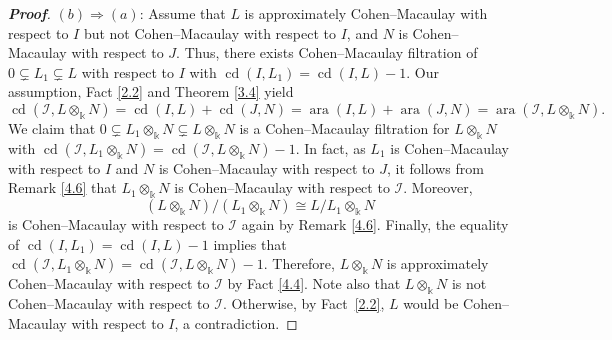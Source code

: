 \documentclass[10pt,a4paper]{amsart}
\numberwithin{equation}{theorem}
\theoremstyle{definition}
\theoremstyle{fact}
\theoremstyle{conjecture}
\newcommand{\ara}{\operatorname{ara}}
\newcommand{\cd}{\operatorname{cd}}
\newenvironment{prf}[1][Proof]{\begin{proof}[\bf #1]}{\end{proof}}
\begin{document}
\begin{prf}
\((b) \Rightarrow (a)\): Assume that $L$ is approximately Cohen--Macaulay with respect to $I$ but not Cohen--Macaulay with respect to $I$, and $N$ is Cohen--Macaulay with respect to $J$.
  Thus, there exists Cohen--Macaulay filtration of $0  \subsetneq L_1 \subsetneq L$ with respect to $I$ with
$\cd(I, L_1)=\cd(I,  L)-1$.
Our assumption, Fact \ref{2.2} and Theorem \ref{3.4} yield
\[
\cd(\mathcal{I}, L\otimes_\Bbbk N)= \cd(I, L)+\cd(J, N)= \ara(I, L)+\ara(J, N)=\ara(\mathcal{I}, L\otimes_\Bbbk N).
\]
We claim that $0\subsetneq L_1\otimes_\Bbbk N \subsetneq L\otimes_\Bbbk N$ is a Cohen--Macaulay filtration for $L\otimes_\Bbbk N$ with
$\cd(\mathcal{I}, L_1\otimes_\Bbbk N) =\cd(\mathcal{I}, L\otimes_\Bbbk N)-1$.
In fact, as $L_1$ is Cohen--Macaulay with respect to $I$ and $N$ is Cohen--Macaulay with respect to $J$, it follows from Remark \ref{4.6} that $L_1\otimes_\Bbbk N$ is Cohen--Macaulay with respect to $\mathcal{I}$. Moreover,
\[
(L\otimes_\Bbbk N)/(L_1\otimes_\Bbbk N)\cong L/L_1\otimes_\Bbbk N
\]
is Cohen--Macaulay with respect to $\mathcal{I}$ again by Remark \ref{4.6}. Finally, the equality of $\cd(I,  L_1)=\cd(I, L)-1$
  implies that $\cd(\mathcal{I}, L_1\otimes_\Bbbk N)=\cd(\mathcal{I}, L\otimes_\Bbbk N)-1$.
 Therefore,  $L \otimes_\Bbbk N$ is approximately Cohen--Macaulay with respect to $\mathcal{I}$ by Fact \ref{4.4}.
Note also that $L\otimes_\Bbbk N$ is not Cohen--Macaulay with respect to $\mathcal{I}$. Otherwise, by Fact~\ref{2.2}, $L$ would be Cohen--Macaulay with respect to $I$, a contradiction.
 \end{prf}
\end{document}
